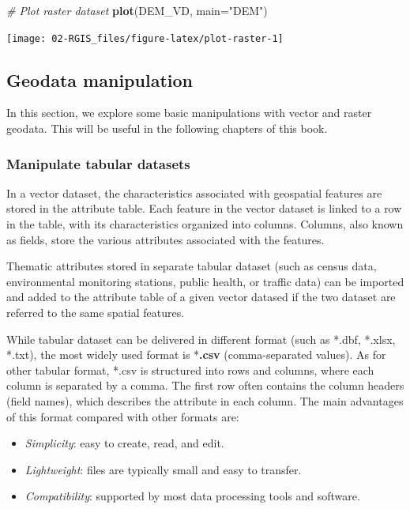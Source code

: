 \documentclass[
]{article}
\newenvironment{Shaded}{\begin{snugshade}}{\end{snugshade}}
\newcommand{\AttributeTok}[1]{\textcolor[rgb]{0.13,0.29,0.53}{#1}}
\newcommand{\CommentTok}[1]{\textcolor[rgb]{0.56,0.35,0.01}{\textit{#1}}}
\newcommand{\FunctionTok}[1]{\textcolor[rgb]{0.13,0.29,0.53}{\textbf{#1}}}
\newcommand{\NormalTok}[1]{#1}
\newcommand{\StringTok}[1]{\textcolor[rgb]{0.31,0.60,0.02}{#1}}
\providecommand{\tightlist}{%
  \setlength{\itemsep}{0pt}\setlength{\parskip}{0pt}}
\begin{document}
\begin{Shaded}
\begin{Highlighting}[]
\CommentTok{\# Plot raster dataset}
\FunctionTok{plot}\NormalTok{(DEM\_VD, }\AttributeTok{main=}\StringTok{"DEM"}\NormalTok{)}
\end{Highlighting}
\end{Shaded}

\begin{center}\texttt{[image: 02-RGIS\_files/figure-latex/plot-raster-1]} \end{center}

\subsection{Geodata manipulation}\label{geodata-manipulation}

In this section, we explore some basic manipulations with vector and raster geodata. This will be useful in the following chapters of this book.

\subsubsection{Manipulate tabular datasets}\label{manipulate-tabular-datasets}

In a vector dataset, the characteristics associated with geospatial features are stored in the attribute table. Each feature in the vector dataset is linked to a row in the table, with its characteristics organized into columns. Columns, also known as fields, store the various attributes associated with the features.

Thematic attributes stored in separate tabular dataset (such as census data, environmental monitoring stations, public health, or traffic data) can be imported and added to the attribute table of a given vector datased if the two dataset are referred to the same spatial features.

While tabular dataset can be delivered in different format (such as *.dbf, *.xlsx, *.txt), the most widely used format is *\textbf{.csv} (comma-separated values). As for other tabular format, *.csv is structured into rows and columns, where each column is separated by a comma. The first row often contains the column headers (field names), which describes the attribute in each column. The main advantages of this format compared with other formats are:

\begin{itemize}
\tightlist
\item
  \emph{Simplicity}: easy to create, read, and edit.
\item
  \emph{Lightweight}: files are typically small and easy to transfer.
\item
  \emph{Compatibility}: supported by most data processing tools and software.
\end{itemize}
\end{document}
